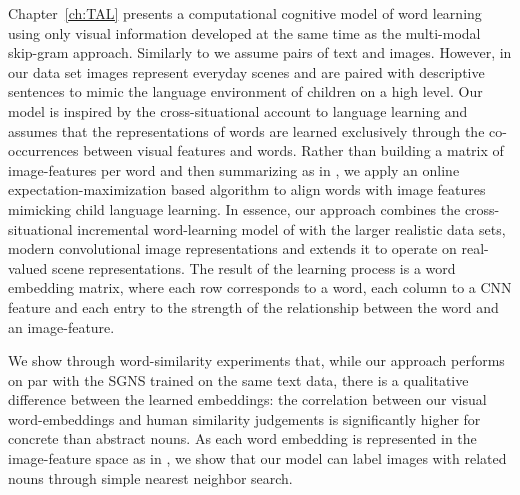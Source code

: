 Chapter~\ref{ch:TAL} presents a computational cognitive model of word learning using only
visual information developed at the same time as the multi-modal skip-gram approach.
Similarly to \cite{feng2010visual} we assume pairs of text and images. 
However, in our data set images represent everyday scenes and are paired with descriptive
sentences to mimic the language environment of children on a high level.
Our model is inspired by the cross-situational account to language
learning  and assumes that the representations of words are learned exclusively through the co-occurrences
between visual features and words. Rather than building a
matrix of image-features per word and then summarizing as in \cite{kiela2014learning},
we apply an online expectation-maximization based 
algorithm \citep{dempster1977maximum} to align words with image features mimicking 
child language learning.
In essence, our approach combines the cross-situational incremental word-learning model
of \cite{fazly.etal.10csj} with the larger realistic data sets, modern convolutional image representations
and extends it to operate on real-valued scene representations.
The result of the learning process is a word embedding matrix,
where each row corresponds to a word, each column 
to a CNN feature and each entry to the strength
of the relationship between the word and an image-feature.

We show through word-similarity experiments that, while our approach performs on
par with the SGNS trained on the same text data, there is a qualitative difference between
the learned embeddings: the correlation between our visual word-embeddings 
and human similarity judgements is significantly higher for concrete than abstract nouns. 
As each word embedding  is represented in the
image-feature space as in \cite{kiela2014learning}, we show that our model can label images 
with related nouns through simple nearest neighbor search.

